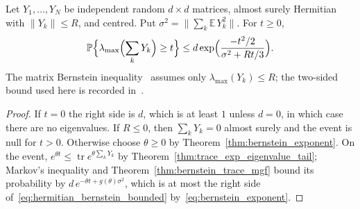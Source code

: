 \begin{theorem}
    \label{thm:hermitian_bernstein_bounded}
    \leanok
    Let $Y_1,\dots,Y_N$ be independent random $d\times d$ matrices, almost surely
    Hermitian with $\|Y_k\|\le R$, and centred. Put
    $\sigma^{2}=\bigl\|\sum_k\mathbb{E}\,Y_k^{2}\bigr\|$. For $t\ge0$,
    \begin{align}
        \label{eq:hermitian_bernstein_bounded}
        \mathbb{P}\Bigl\{\lambda_{\max}\Bigl(\sum_kY_k\Bigr)\ge t\Bigr\}
        \le d\exp\Bigl(\frac{-t^{2}/2}{\sigma^{2}+Rt/3}\Bigr).
    \end{align}
    The matrix Bernstein inequality~\cite[Theorems~1.4 and~6.1]{Tropp2012User}
    assumes only $\lambda_{\max}(Y_k)\le R$; the two-sided bound used here is
    recorded in~\cite{gap:tropp12_bounded_summands_scope}.
\end{theorem}
\begin{proof}\leanok
    If $t=0$ the right side is $d$, which is at least $1$ unless $d=0$, in which
    case there are no eigenvalues. If $R\le0$, then $\sum_kY_k=0$ almost surely
    and the event is null for $t>0$. Otherwise choose $\theta\ge0$ by
    Theorem~\ref{thm:bernstein_exponent}. On the event,
    $e^{\theta t}\le\operatorname{tr}e^{\theta\sum_kY_k}$ by
    Theorem~\ref{thm:trace_exp_eigenvalue_tail}; Markov's inequality and
    Theorem~\ref{thm:bernstein_trace_mgf} bound its probability by
    $d\,e^{-\theta t+g(\theta)\sigma^{2}}$, which is at most the right side
    of~\eqref{eq:hermitian_bernstein_bounded} by~\eqref{eq:bernstein_exponent}.
\end{proof}

